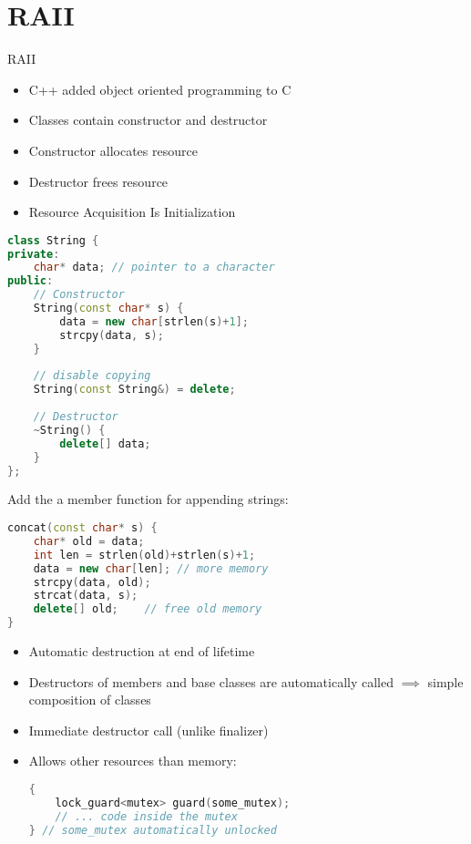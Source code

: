 \documentclass[xcolor=colortbl
]{beamer}
\begin{document}
\section{RAII}

\begin{frame}{RAII}
    \begin{itemize}
        \item C++ added object oriented programming to C
        \item Classes contain constructor and destructor
        \item Constructor allocates resource
        \item Destructor frees resource
        \item Resource Acquisition Is Initialization
    \end{itemize}
\end{frame}


\begin{frame}
\begin{lstlisting}[language=c++,frame=single]
class String {
private:
    char* data; // pointer to a character
public:
    // Constructor
    String(const char* s) {
        data = new char[strlen(s)+1];
        strcpy(data, s);
    }
    
    // disable copying
    String(const String&) = delete;
    
    // Destructor
    ~String() {
        delete[] data;
    }
};
\end{lstlisting}
\end{frame}

\begin{frame}[fragile]
    Add the a member function for appending strings:
\begin{lstlisting}[language=c++, frame=single]
concat(const char* s) {
    char* old = data;
    int len = strlen(old)+strlen(s)+1;
    data = new char[len]; // more memory
    strcpy(data, old);
    strcat(data, s);
    delete[] old;    // free old memory
}
\end{lstlisting}

\end{frame}



\begin{frame}[fragile]
    \begin{itemize}
        \item Automatic destruction at end of lifetime
        \item Destructors of members and base classes are automatically called
            $ \implies $ simple composition of classes
        \item Immediate destructor call (unlike finalizer)
        \item Allows other resources than memory:
        \begin{lstlisting}[language=c++, frame=single]
{
    lock_guard<mutex> guard(some_mutex);
    // ... code inside the mutex
} // some_mutex automatically unlocked
        \end{lstlisting}
    \end{itemize}
\end{frame}
\end{document}
